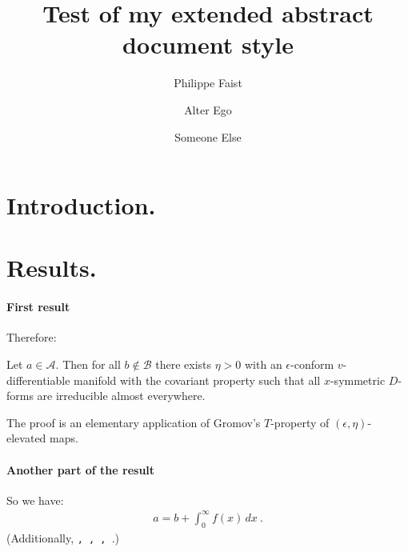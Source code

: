 \documentclass[
    papertype=a4paper,
]{phfextendedabstract}
\begin{document}
\title{Test of my extended abstract document style}
\author{Philippe Faist}
\author{Alter Ego}
\author{Someone Else}
\maketitle


\section{Introduction.}
\lipsum[1]

\section{Results.}
\lipsum[2]

\paragraph{First result}
\lipsum[3]
Therefore:

\begin{theorem}
  Let $a\in \mathcal{A}$.  Then for all $b\notin\mathcal{B}$ there exists
  $\eta>0$ with an $\epsilon$-conform $v$-differentiable manifold with the
  covariant property such that all $x$-symmetric $D$-forms are irreducible
  almost everywhere.
\end{theorem}

The proof is an elementary application of Gromov's $T$-property of
$(\epsilon,\eta)$-elevated maps.

\paragraph{Another part of the result}
\lipsum[4]
So we have:
\begin{align}
  a = b + \int_0^\infty f(x)\,dx\ .
\end{align}
(Additionally, \texttt{\the\abovedisplayskip, \the\belowdisplayskip,
  \the\abovedisplayshortskip, \the\belowdisplayshortskip}.)
\end{document}
